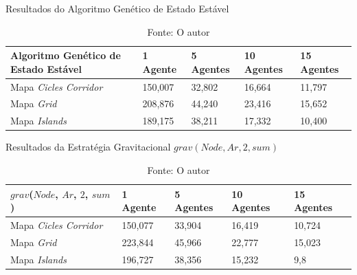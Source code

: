 \begin{table}
	\centering
	\caption{Resultados do Algoritmo Genético de Estado Estável}
	\label{result_ssgenetic}
	\begin{tabularx}{\linewidth}{|X|X|X|X|X|}
		\hline
		\textbf{Algoritmo Genético de Estado Estável} & \textbf{1 Agente} & \textbf{5 Agentes} & \textbf{10 Agentes} & \textbf{15 Agentes} \\
		\hline
		Mapa \textit{Cicles Corridor} & 150,007 & 32,802 & 16,664 & 11,797 \\
		\hline
		Mapa \textit{Grid} & 208,876 & 44,240 & 23,416 & 15,652 \\
		\hline
		Mapa \textit{Islands} & 189,175 & 38,211 & 17,332 & 10,400 \\
		\hline
	\end{tabularx}
	\caption*{Fonte: O autor}
\end{table}

\begin{table}
	\centering
	\caption{Resultados da Estratégia Gravitacional $grav(Node,Ar,2,sum)$}
	\label{result_grav1}
	\begin{tabularx}{\linewidth}{|X|X|X|X|X|}
		\hline
		\textbf{$grav$($Node$, $Ar$, $2$, $sum$)} & \textbf{1 Agente} & \textbf{5 Agentes} & \textbf{10 Agentes} & \textbf{15 Agentes} \\
		\hline
		Mapa \textit{Cicles Corridor} & 150,077 & 33,904 & 16,419 & 10,724 \\
		\hline
		Mapa \textit{Grid} & 223,844 & 45,966 & 22,777 & 15,023 \\
		\hline
		Mapa \textit{Islands} & 196,727 & 38,356 & 15,232 & 9,8 \\
		\hline
	\end{tabularx}
	\caption*{Fonte: O autor}
\end{table}

